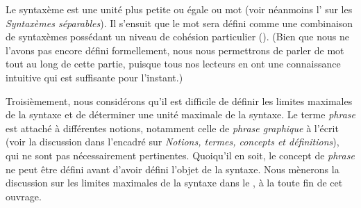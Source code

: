 Le syntaxème est une unité plus petite ou égale ou mot (voir néanmoins l’ sur les \textit{Syntaxèmes séparables}). Il s’ensuit que le mot sera défini comme une combinaison de syntaxèmes possédant un niveau de cohésion particulier (). (Bien que nous ne l’avons pas encore défini formellement, nous nous permettrons de parler de mot tout au long de cette partie, puisque tous nos lecteurs en ont une connaissance intuitive qui est suffisante pour l’instant.)

Troisièmement, nous considérons qu'il est difficile de définir les limites maximales de la syntaxe et de déterminer une unité maximale de la syntaxe. Le terme \textit{phrase} est attaché à différentes notions, notamment celle de \textit{phrase graphique} à l'écrit (voir la discussion dans l'encadré  sur \textit{Notions, termes, concepts et définitions}), qui ne sont pas nécessairement pertinentes. Quoiqu'il en soit, le concept de \textit{phrase} ne peut être défini avant d'avoir défini l'objet de la syntaxe. Nous mènerons la discussion sur les limites maximales de la syntaxe dans le , à la toute fin de cet ouvrage.

